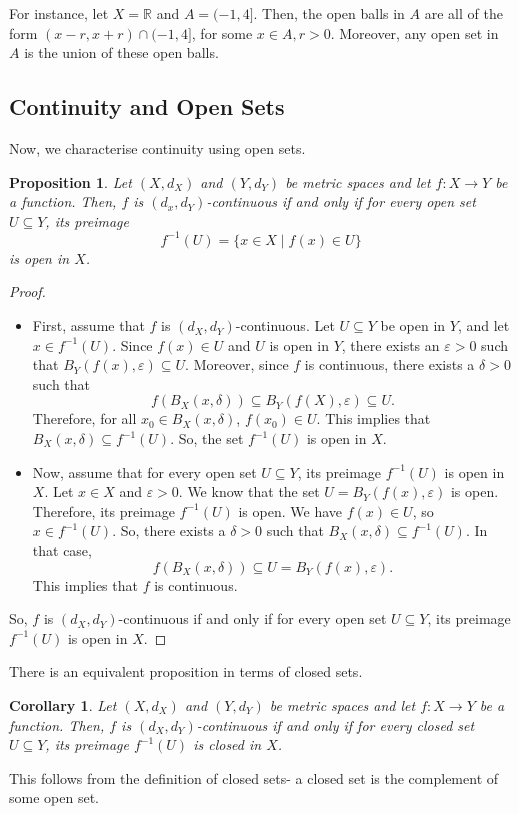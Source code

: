 \documentclass[a4paper, openany]{memoir}
\theoremstyle{definition}
\theoremstyle{plain}
\newtheorem{proposition}[definition]{Proposition}
\newtheorem{corollary}[definition]{Corollary}
\begin{document}
\noindent For instance, let $X = \mathbb{R}$ and $A = (-1, 4]$. Then, the open balls in $A$ are all of the form $(x - r, x + r) \cap (-1, 4]$, for some $x \in A, r > 0$. Moreover, any open set in $A$ is the union of these open balls.

\subsection{Continuity and Open Sets}
Now, we characterise continuity using open sets.
\begin{proposition}
Let $(X, d_X)$ and $(Y, d_Y)$ be metric spaces and let $f: X \to Y$ be a function. Then, $f$ is $(d_x, d_Y)$-continuous if and only if for every open set $U \subseteq Y$, its preimage
\[f^{-1}(U) = \{x \in X \mid f(x) \in U\}\]
is open in $X$.
\end{proposition}
\begin{proof}
\hspace*{0pt}
\begin{itemize}
    \item First, assume that $f$ is $(d_X, d_Y)$-continuous. Let $U \subseteq Y$ be open in $Y$, and let $x \in f^{-1}(U)$. Since $f(x) \in U$ and $U$ is open in $Y$, there exists an $\varepsilon > 0$ such that $B_Y(f(x), \varepsilon) \subseteq U$. Moreover, since $f$ is continuous, there exists a $\delta > 0$ such that 
    \[f(B_X(x, \delta)) \subseteq B_Y(f(X), \varepsilon) \subseteq U.\]
    Therefore, for all $x_0 \in B_X(x, \delta)$, $f(x_0) \in U$. This implies that $B_X(x, \delta) \subseteq f^{-1}(U)$. So, the set $f^{-1}(U)$ is open in $X$.
    
    \item Now, assume that for every open set $U \subseteq Y$, its preimage $f^{-1}(U)$ is open in $X$. Let $x \in X$ and $\varepsilon > 0$. We know that the set $U = B_Y(f(x), \varepsilon)$ is open. Therefore, its preimage $f^{-1}(U)$ is open. We have $f(x) \in U$, so $x \in f^{-1}(U)$. So, there exists a $\delta > 0$ such that $B_X(x, \delta) \subseteq f^{-1}(U)$. In that case,
    \[f(B_X(x, \delta)) \subseteq U = B_Y(f(x), \varepsilon).\]
    This implies that $f$ is continuous.
\end{itemize}
So, $f$ is $(d_X, d_Y)$-continuous if and only if for every open set $U \subseteq Y$, its preimage $f^{-1}(U)$ is open in $X$.
\end{proof}
\noindent There is an equivalent proposition in terms of closed sets.
\begin{corollary}
Let $(X, d_X)$ and $(Y, d_Y)$ be metric spaces and let $f: X \to Y$ be a function. Then, $f$ is $(d_X, d_Y)$-continuous if and only if for every closed set $U \subseteq Y$, its preimage $f^{-1}(U)$ is closed in $X$.
\end{corollary}
\noindent This follows from the definition of closed sets- a closed set is the complement of some open set.
\end{document}
